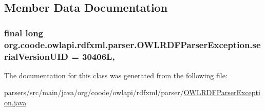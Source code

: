 \subsection{Member Data Documentation}
\hypertarget{classorg_1_1coode_1_1owlapi_1_1rdfxml_1_1parser_1_1_o_w_l_r_d_f_parser_exception_abab32617131a1040f6981963e708a13b}{
\subsubsection[{serial\-Version\-U\-I\-D}]{\setlength{\rightskip}{0pt plus 5cm}final long org.\-coode.\-owlapi.\-rdfxml.\-parser.\-O\-W\-L\-R\-D\-F\-Parser\-Exception.\-serial\-Version\-U\-I\-D = 30406\-L\hspace{0.3cm}{\ttfamily [static]}, {\ttfamily [private]}}}\label{classorg_1_1coode_1_1owlapi_1_1rdfxml_1_1parser_1_1_o_w_l_r_d_f_parser_exception_abab32617131a1040f6981963e708a13b}


The documentation for this class was generated from the following file\-:\begin{DoxyCompactItemize}
\item 
parsers/src/main/java/org/coode/owlapi/rdfxml/parser/\hyperlink{_o_w_l_r_d_f_parser_exception_8java}{O\-W\-L\-R\-D\-F\-Parser\-Exception.\-java}\end{DoxyCompactItemize}
